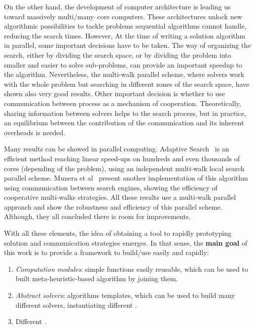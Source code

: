 On the other hand, the development of computer architecture is leading us toward massively multi/many--core computers. These architectures unlock new algorithmic possibilities to tackle problems sequential algorithms cannot handle, reducing the search times.  However,  At the time of writing a solution algorithm in parallel, some important decisions have to be taken. The way of organizing the search, either by dividing the search space, or by dividing the problem into smaller and easier to solve sub-problems, can provide an important speedup to the algorithm. Nevertheless, the multi-walk parallel scheme, where solvers work with the whole problem but searching in different zones of the search space, have shown also very good results. Other important decision is whether to use communication between process as a mechanism of cooperation. Theoretically, sharing information between solvers helps to the search process, but in practice, an equilibrium between the contribution of the communication and its inherent overheads is needed.

Many results can be showed in parallel computing. Adaptive Search~\cite{Diaz} is an efficient method reaching linear speed-ups on hundreds and even thousands of cores (depending of the problem), using an independent multi-walk local search parallel scheme. Munera et al~\cite{Munera} present another implementation of this algorithm using communication between search engines, showing the efficiency of cooperative multi-walks strategies. All these results use a multi-walk parallel approach and show the robustness and efficiency of this parallel scheme. Although, they all concluded there is room for improvements. 

With all these elements, the idea of obtaining a tool to rapidly prototyping solution and communication strategies emerges. In that sense, the \textbf{main goal} of this work is to provide a framework to build/use easily and rapidly:
\begin{enumerate}
\item \textit{Computation modules}: simple functions easily reusable, which can be used to built meta-heuristic-based algorithm by joining them.
\item \textit{Abstract solvers}: algorithms templates, which can be used to build many different solvers, instantiating different \oms.
\item Different \comstrs.
\end{enumerate} 

